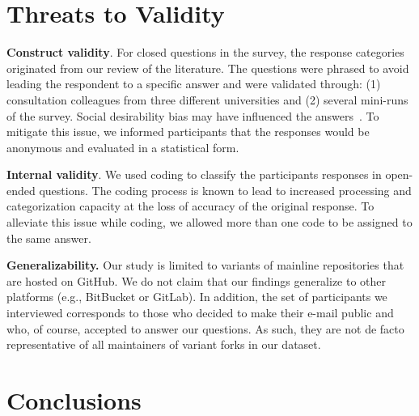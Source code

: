 \section{Threats to Validity}

\noindent \textbf{Construct validity}.
For closed questions in the survey, the response categories originated from our review of the literature.
The questions were phrased to avoid leading the respondent to a specific answer and were validated through: (1) consultation colleagues from three different universities and (2) several mini-runs of the survey. %
Social desirability bias may have influenced the answers~\cite{Furnham:1986}. To mitigate this issue, we informed participants that the responses would be anonymous and evaluated in a statistical form.

\noindent \textbf{Internal validity}. We used coding to classify the participants responses in open-ended questions. The coding process is known to lead to increased processing and categorization capacity at the loss of accuracy of the original response. To alleviate this issue while coding, we allowed more than one code to be assigned to the same answer.

\noindent \textbf{Generalizability.} Our study is limited to variants of mainline repositories that are hosted on GitHub. We do not claim that our findings generalize to other platforms (e.g., \textsf{BitBucket} or \textsf{GitLab}).
In addition, the set of participants we interviewed corresponds to those who decided to make their e-mail public and who, of course, accepted to answer our questions. As such, they are not de facto representative of all maintainers of variant forks in our dataset.

\section{Conclusions}

